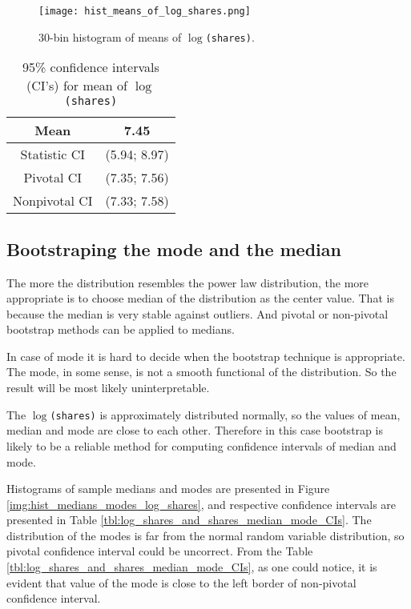 \begin{figure}[h!]
 \begin{center}
    \center \texttt{[image: hist\_means\_of\_log\_shares.png]}
   \caption{30-bin histogram of means of \texttt{$\log$(shares)}.}
   \label{img:hist_means_of_log_shares}
 \end{center}
\end{figure} 

\begin{table}
\caption{95\% confidence intervals (CI's) for mean of \texttt{$\log$(shares)}} \label{tbl:log_shares_stats}
\begin{center}
\begin{tabular}{|c|c|} 
 \hline
Mean & 7.45 \\ \hline 
Statistic CI & (5.94; 8.97) \\ \hline
Pivotal CI & (7.35; 7.56) \\ \hline
Nonpivotal CI & (7.33; 7.58) \\ \hline
\end{tabular}
\end{center}
\end{table}

\subsection*{Bootstraping the mode and the median}
The more the distribution resembles the  power law distribution, the more appropriate is to choose median of the distribution as the center value. That is because the median is very stable against outliers. 
And pivotal or non-pivotal bootstrap methods can be applied to medians. 

In case of mode it is hard to decide when the  bootstrap technique is appropriate. The mode, in some sense, is not a smooth functional of the distribution. So the result will be most likely uninterpretable. 

The \texttt{$\log$(shares)} is approximately distributed  normally, so the values of mean, median and mode are close to each other. Therefore in this case bootstrap  is likely to be a reliable method for computing confidence intervals of median and mode.   

Histograms of sample medians and modes are presented in Figure \ref{img:hist_medians_modes_log_shares}, and respective confidence intervals are presented in Table \ref{tbl:log_shares_and_shares_median_mode_CIs}. The distribution of the modes is far from the normal random variable  distribution, so pivotal confidence interval could be uncorrect. From the Table \ref{tbl:log_shares_and_shares_median_mode_CIs}, as one could notice, it is evident that value of the mode is close to the left border of non-pivotal confidence interval.   

